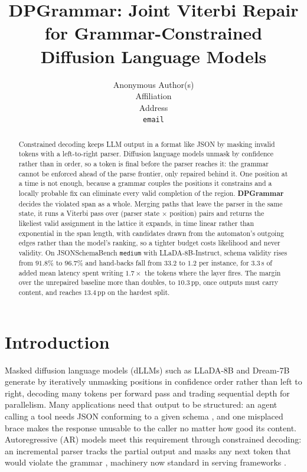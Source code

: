 \documentclass{article}
\title{DPGrammar: Joint Viterbi Repair for Grammar-Constrained\\Diffusion Language Models}
\author{%
  Anonymous Author(s)\\
  Affiliation\\
  Address\\
  \texttt{email}
}
\begin{document}
\maketitle

\begin{abstract}
Constrained decoding keeps LLM output in a format like JSON by masking invalid
tokens with a left-to-right parser. Diffusion language models unmask by
confidence rather than in order, so a token is final before the parser reaches
it: the grammar cannot be enforced ahead of the parse frontier, only repaired
behind it. One position at a time is not enough, because a grammar couples the
positions it constrains and a locally probable fix can eliminate every valid
completion of the region. \textbf{DPGrammar} decides the violated span as a
whole. Merging paths that leave the parser in the same state, it runs a Viterbi
pass over (parser state $\times$ position) pairs and returns the likeliest valid assignment in the lattice it expands, in time
linear rather than exponential in the span length, with candidates drawn
from the automaton's outgoing edges rather than the model's ranking, so a tighter
budget costs likelihood and never validity. On JSONSchemaBench \texttt{medium}
with LLaDA-8B-Instruct, schema validity rises from $91.8\%$ to $96.7\%$ and
hand-backs fall from $33.2$ to $1.2$ per instance, for $3.3$\,s of
added mean latency spent writing $1.7\times$ the tokens where the layer fires. The margin over the
unrepaired baseline more than doubles, to $10.3$\,pp, once outputs must carry
content, and reaches $13.4$\,pp on the hardest split.
\end{abstract}

\section{Introduction}

Masked diffusion language models (dLLMs) such as LLaDA-8B \citep{llada} and Dream-7B \citep{dream} generate by iteratively unmasking
positions in confidence order rather than left to right, decoding many tokens
per forward pass and trading sequential depth for parallelism. Many applications need that output to be structured: an agent calling a tool
needs JSON conforming to a given schema
\citep{patil2025bfcl,geng2025jsonschemabenchrigorousbenchmarkstructured}, and one
misplaced brace makes the response unusable to the caller no matter how good its
content. Autoregressive (AR) models meet this requirement through constrained
decoding: an incremental parser tracks the partial output and masks any next
token that would violate the grammar \citep{outlines}, machinery now standard in
serving frameworks \citep{dong2024xgrammar,guidance,zheng2024sglang,microsoft2025llguidance}.
\end{document}
